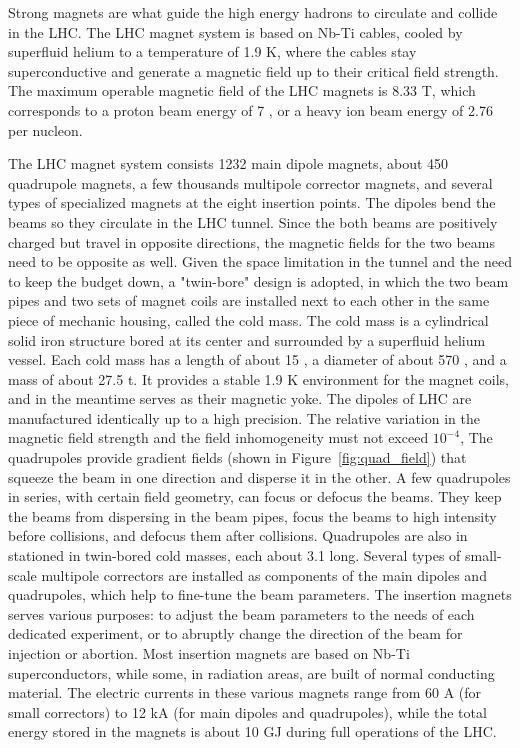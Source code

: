 Strong magnets are what guide the high energy hadrons to circulate and collide in the LHC. 
The LHC magnet system is based on Nb-Ti cables, cooled by superfluid helium to a temperature of 1.9 K,
where the cables stay superconductive and generate a magnetic field up to their critical field strength.
The maximum operable magnetic field of the LHC magnets is 8.33 T, which corresponds to a proton beam energy of 7 \TeV,
or a heavy ion beam energy of 2.76 \TeV per nucleon.

The LHC magnet system consists 1232 main dipole magnets, about 450 quadrupole magnets,
a few thousands multipole corrector magnets, and several types of specialized magnets at the eight insertion points.
The dipoles 
bend the beams so they circulate in the LHC tunnel.
Since the both beams are positively charged but travel in opposite directions,
the magnetic fields for the two beams need to be opposite as well.
Given the space limitation in the tunnel and the need to keep the budget down, a "twin-bore" design is adopted, 
in which the two beam pipes and two sets of magnet coils are installed next to each other in the same piece of mechanic housing, called the cold mass.
The cold mass is a cylindrical solid iron structure bored at its center and surrounded by a superfluid helium vessel.
Each cold mass has a length of about 15 \meter, a diameter of about 570 \mm, and a mass of about 27.5 t.
It provides a stable 1.9 K environment for the magnet coils, and in the meantime serves as their magnetic yoke.
The dipoles of LHC are manufactured identically up to a high precision.
The relative variation in the magnetic field strength and the field inhomogeneity must not exceed $10^{-4}$,
The quadrupoles 
provide gradient fields (shown in Figure~\ref{fig:quad_field}) that squeeze the beam in one direction and disperse it in the other.
A few quadrupoles in series, with certain field geometry, can focus or defocus the beams.
They keep the beams from dispersing in the beam pipes, focus the beams to high intensity before collisions, and defocus them after collisions.
Quadrupoles are also in stationed in twin-bored cold masses, each about 3.1 \meter long.
Several types 
of small-scale multipole correctors are installed as components of the main dipoles and quadrupoles, 
which help to fine-tune the beam parameters. 
The insertion magnets 
serves various purposes: to adjust the beam parameters to the needs of each dedicated experiment, 
or to abruptly change the direction of the beam for injection or abortion.
Most insertion magnets are based on Nb-Ti superconductors, 
while some, in radiation areas, are built of normal conducting material.
The electric currents in these various magnets range from 60 A (for small correctors) to 12 kA (for main dipoles and quadrupoles),
while the total energy stored in the magnets is about 10 GJ during full operations of the LHC.

